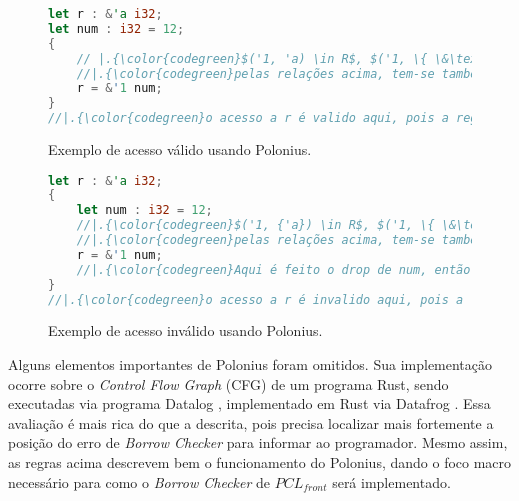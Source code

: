 \begin{figure}[ht]
	\caption{Exemplo de acesso válido usando Polonius.}
	\label{fig:ex:polonius:1}
	\begin{lstlisting}[language=Rust]
let r : &'a i32;
let num : i32 = 12;
{
	// |.{\color{codegreen}$('1, 'a) \in R$, $('1, \{ \&\text{num} \}) \in L$}.
	//|.{\color{codegreen}pelas relações acima, tem-se também que $('a, \{ \&\text{num} \}) \in L$}.
	r = &'1 num; 
}
//|.{\color{codegreen}o acesso a r é valido aqui, pois a região 'a está viva $('a, \{ \&num \}) \in L$}
	\end{lstlisting}
\end{figure}


\begin{figure}[ht]
	\caption{Exemplo de acesso inválido usando Polonius. }
	\label{fig:ex:polonius:2}
	\begin{lstlisting}[language=Rust]
let r : &'a i32;
{
	let num : i32 = 12;
	//|.{\color{codegreen}$('1, {'a}) \in R$, $('1, \{ \&\text{num} \}) \in L$}.
	//|.{\color{codegreen}pelas relações acima, tem-se também que $('a, \{ \&\text{num} \}) \in L$}.
	r = &'1 num; 
	//|.{\color{codegreen}Aqui é feito o drop de num, então invalida-se a concessão \&num}.
}
//|.{\color{codegreen}o acesso a r é invalido aqui, pois a 'a está não está viva $\forall ls \subseteq Loans,('a, ls) \notin L$}

	\end{lstlisting}
\end{figure}


Alguns elementos importantes de Polonius foram omitidos. Sua implementação ocorre sobre o \emph{Control Flow Graph} (CFG) de um programa Rust, sendo executadas via programa Datalog \cite{DATALOG}, implementado em Rust via Datafrog \cite{DATAFROG}. Essa avaliação é mais rica do que a descrita, pois precisa localizar mais fortemente a posição do erro de \emph{Borrow Checker} para informar ao programador. Mesmo assim, as regras acima descrevem bem o funcionamento do Polonius, dando o foco macro necessário para como o \emph{Borrow Checker} de $PCL_{front}$ será implementado.


